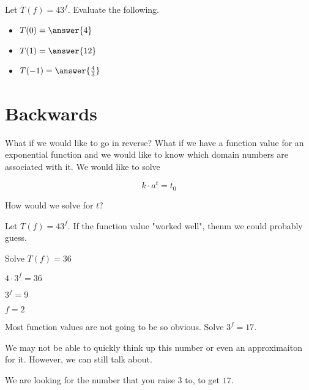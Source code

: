 \documentclass{ximera}
\begin{document}
\begin{example}

Let $T(f) = 4 3^f$.  Evaluate the following.

\begin{itemize}
\item $T(0) = \answer{4}$ 
\item $T(1) = \answer{12}$
\item $T(-1) = \answer{\frac{4}{3}}$
\end{itemize}
\end{example}








\section{Backwards}

What if we would like to go in reverse?  What if we have a function value for an exponential function and we would like to know which domain numbers are associated with it.  We would like to solve


\[    k \cdot a^t  =  t_0     \]


How would we solve for $t$?






\begin{example}

Let $T(f) = 4 3^f$.  If the function value "worked well", thenm we could probably guess.


Solve $T(f) = 36$

$4 \cdot 3^f = 36$

$3^f = 9$

$f = 2$

\end{example}









Most function values are not going to be so obvious. Solve $ 3^f = 17$.


We may not be able to quickly think up this number or even an approximaiton for it.  However, we can still talk about.

\begin{center}
We are looking for the number that you raise $3$ to, to get $17$.
\end{center}
\end{document}
